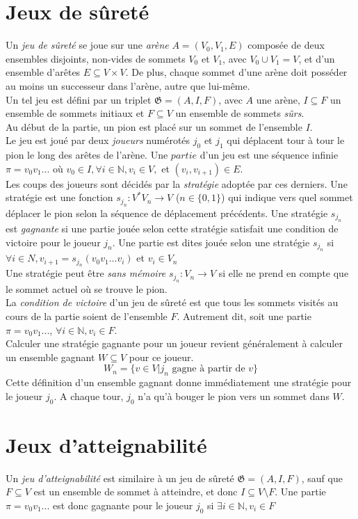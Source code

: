 \documentclass[12pt,a4paper,oneside, titlepage]{report}
\begin{document}
\section*{Jeux de sûreté}
Un \emph{jeu de sûreté} se joue sur une \emph{arène} $A = (V_0,V_1,E)$ composée de deux ensembles disjoints, non-vides de sommets $V_0$ et $V_1$, avec $V_0 \cup V_1 = V$, et d'un ensemble d'arêtes $E \subseteq V\times V$. De plus, chaque sommet d'une arène doit posséder au moins un successeur dans l'arène, autre que lui-même.\\
Un tel jeu est défini par un triplet $\mathfrak{G} = (A, I, F)$, avec $A$ une arène, $I\subseteq F$ un ensemble de sommets initiaux et $F\subseteq V$ un ensemble de sommets \emph{sûrs}. \\
Au début de la partie, un pion est placé sur un sommet de l'ensemble $I$.\\
Le jeu est joué par deux \emph{joueurs} numérotés $j_0$ et $j_1$ qui déplacent tour à tour le pion le long des arêtes de l'arène. Une $partie$ d'un jeu est une séquence infinie $\pi=v_0 v_1 ...$ où $v_0\in I, \forall i\in \mathbb{N},v_i \in V, $ et $(v_i, v_{i+1})\in E$.\\
Les coups des joueurs sont décidés par la \emph{stratégie} adoptée par ces derniers. Une stratégie est une fonction $s_{j_n} : V^*V_n\to V$ ($n\in \{0,1\}$) qui indique vers quel sommet déplacer le pion selon la séquence de déplacement précédents.
Une stratégie $s_{j_n}$ est \emph{gagnante} si une partie jouée selon cette stratégie satisfait une condition de victoire pour le joueur $j_n$.
Une partie est dites jouée selon une stratégie $s_{j_n}$ si
$\forall i \in N, v_{i+1} = s_{j_n}(v_0v_1...v_i)$ et $v_i \in V_n$\\
Une stratégie peut être \emph{sans mémoire} $s_{j_n} : V_n \to V$ si elle ne prend en compte que le sommet actuel où se trouve le pion.\\
La \emph{condition de victoire} d'un jeu de sûreté est que tous les sommets visités au cours de la partie soient de l'ensemble $F$. Autrement dit, soit une partie $\pi = v_0v_1...$, $\forall i\in\mathbb{N}, v_i\in F$.\\
Calculer une stratégie gagnante pour un joueur revient généralement à calculer un ensemble gagnant $W\subseteq V$ pour ce joueur.
$$W_n=\{v\in V|j_n\text{ gagne à partir de }v\}$$
Cette définition d'un ensemble gagnant donne immédiatement une stratégie pour le joueur $j_0$. A chaque tour, $j_0$ n'a qu'à bouger le pion vers un sommet dans $W$.
\section*{Jeux d'atteignabilité}
Un \emph{jeu d'atteignabilité} est similaire à un jeu de sûreté $\mathfrak{G} = (A, I, F)$, sauf que $F \subseteq V$ est un ensemble de sommet à atteindre, et donc $I\subseteq V\setminus F$. Une partie $\pi=v_0v_1...$ est donc gagnante pour le joueur $j_0$ si $\exists i \in \mathbb{N}, v_i \in F$
\end{document}
